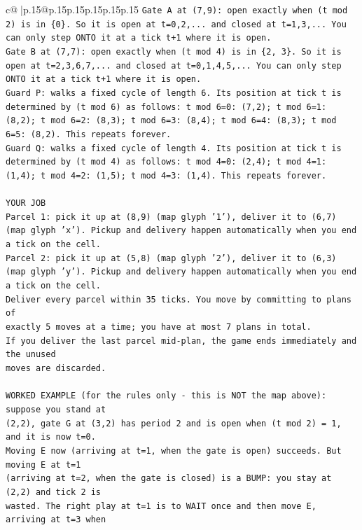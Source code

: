 \documentclass{article}
\begin{document}
{\begin{supertabular}{c@{$\;$}|p{.15\linewidth}@{}p{.15\linewidth}p{.15\linewidth}p{.15\linewidth}p{.15\linewidth}p{.15\linewidth}}
{{{\texttt{Gate A at (7,9): open exactly when (t mod 2) is in \{0\}. So it is open at t=0,2,... and closed at t=1,3,... You can only step ONTO it at a tick t+1 where it is open.} \\
\texttt{Gate B at (7,7): open exactly when (t mod 4) is in \{2, 3\}. So it is open at t=2,3,6,7,... and closed at t=0,1,4,5,... You can only step ONTO it at a tick t+1 where it is open.} \\
\texttt{Guard P: walks a fixed cycle of length 6. Its position at tick t is determined by (t mod 6) as follows: t mod 6=0: (7,2); t mod 6=1: (8,2); t mod 6=2: (8,3); t mod 6=3: (8,4); t mod 6=4: (8,3); t mod 6=5: (8,2). This repeats forever.} \\
\texttt{Guard Q: walks a fixed cycle of length 4. Its position at tick t is determined by (t mod 4) as follows: t mod 4=0: (2,4); t mod 4=1: (1,4); t mod 4=2: (1,5); t mod 4=3: (1,4). This repeats forever.} \\
\\ 
\texttt{YOUR JOB} \\
\texttt{Parcel 1: pick it up at (8,9) (map glyph '1'), deliver it to (6,7) (map glyph 'x'). Pickup and delivery happen automatically when you end a tick on the cell.} \\
\texttt{Parcel 2: pick it up at (5,8) (map glyph '2'), deliver it to (6,3) (map glyph 'y'). Pickup and delivery happen automatically when you end a tick on the cell.} \\
\texttt{Deliver every parcel within 35 ticks. You move by committing to plans of} \\
\texttt{exactly 5 moves at a time; you have at most 7 plans in total.} \\
\texttt{If you deliver the last parcel mid{-}plan, the game ends immediately and the unused} \\
\texttt{moves are discarded.} \\
\\ 
\texttt{WORKED EXAMPLE (for the rules only {-} this is NOT the map above): suppose you stand at} \\
\texttt{(2,2), gate G at (3,2) has period 2 and is open when (t mod 2) = 1, and it is now t=0.} \\
\texttt{Moving E now (arriving at t=1, when the gate is open) succeeds. But moving E at t=1} \\
\texttt{(arriving at t=2, when the gate is closed) is a BUMP: you stay at (2,2) and tick 2 is} \\
\texttt{wasted. The right play at t=1 is to WAIT once and then move E, arriving at t=3 when} \\
}}}
\end{supertabular}}
\end{document}
